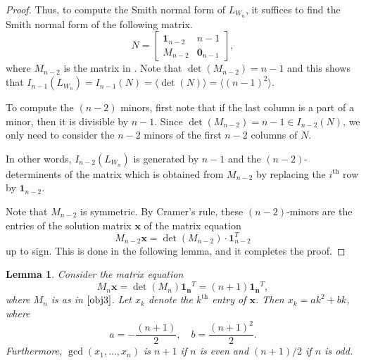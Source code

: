\documentclass[11pt,reqno]{amsart}
\newcommand{\angles}[1]{\langle #1 \rangle}
\theoremstyle{definition}
\theoremstyle{plain}
\newtheorem{lemma}[mydef]{Lemma}
\begin{document}
\begin{proof}
\noindent Thus, to compute the Smith normal form of $L_{W_n}$, it suffices to find the Smith normal form of the following matrix.
\begin{equation*}
N = \left[
\begin{array}{c|c}
\mathbf{1}_{n-2} & n-1 \\
\hline
M_{n-2} & \mathbf{0}_{n-1}
\end{array}
\right],
\end{equation*}
where $M_{n-2}$ is the matrix in . 
Note that $\det(M_{n-2}) = n-1$ and this shows that $I_{n-1}(L_{W_n}) = I_{n-1}(N) = \angles{\det(N)}=\angles{(n-1)^2}$.

To compute the $(n-2)$ minors, first note that if the last column is a part of a minor, then it is divisible by $n-1$. 
Since $\det(M_{n-2}) = n-1 \in I_{n-2}(N)$, we only need to consider the $n-2$ minors of the first $n-2$ columns of $N$. 

In other words, $I_{n-2}(L_{W_n})$ is generated by $n-1$ 
and the $(n-2)$-determinents of the matrix which is obtained from $M_{n-2}$ by replacing the $i^{\textrm{th}}$ row by $\mathbf{1}_{n-2}$.

Note that $M_{n-2}$ is symmetric. 
By Cramer's rule, these $(n-2)$-minors are the entries of the solution matrix $\mathbf{x}$ of the matrix equation
\begin{equation*}
M_{n-2} \mathbf{x} 
= \det(M_{n-2}) \cdot \mathbf{1}_{n-2}^T
\end{equation*}
up to sign.
This is done in the following lemma, and it completes the proof.
\end{proof}

\begin{lemma}\label{M_nCremer}
Consider the matrix equation 
\begin{equation*}
M_n \mathbf{x} 
= \det(M_n) \mathbf{1_n}^T
= (n+1) \mathbf{1_n}^T,
\end{equation*}
where $M_n$ is as in $\Cref{obj3}$. 
Let $x_k$ denote the $k^{\textrm{th}}$ entry of $\mathbf{x}$. Then $x_k = a k^2 + b k$, where
\[
a = -\frac{(n+1)}{2}, \quad b = \frac{(n+1)^2}{2}.
\]
Furthermore, $\gcd(x_1,\dots, x_n)$ is $n+1$ if $n$ is even and $(n+1)/2$ if $n$ is odd. 
\end{lemma}
\end{document}
